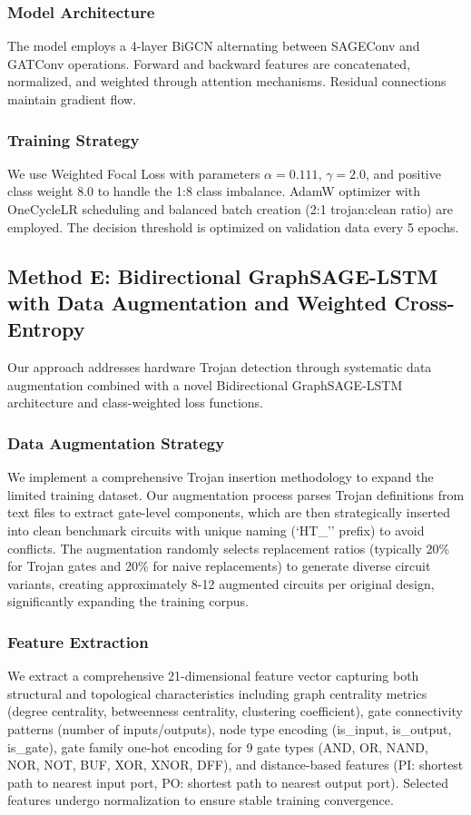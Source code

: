 \documentclass[conference]{IEEEtran}
\begin{document}
\subsubsection{Model Architecture}
The model employs a 4-layer BiGCN alternating between SAGEConv and GATConv operations. Forward and backward features are concatenated, normalized, and weighted through attention mechanisms. Residual connections maintain gradient flow.

\subsubsection{Training Strategy}
We use Weighted Focal Loss with parameters $\alpha=0.111$, $\gamma=2.0$, and positive class weight 8.0 to handle the 1:8 class imbalance. AdamW optimizer with OneCycleLR scheduling and balanced batch creation (2:1 trojan:clean ratio) are employed. The decision threshold is optimized on validation data every 5 epochs.

\FloatBarrier
\subsection{Method E: Bidirectional GraphSAGE-LSTM with Data Augmentation and Weighted Cross-Entropy} 
\label{sec:method_E} 
Our approach addresses hardware Trojan detection through systematic data augmentation combined with a novel Bidirectional GraphSAGE-LSTM architecture and class-weighted loss functions. 

\subsubsection{Data Augmentation Strategy} 
We implement a comprehensive Trojan insertion methodology to expand the limited training dataset. Our augmentation process parses Trojan definitions from text files to extract gate-level components, which are then strategically inserted into clean benchmark circuits with unique naming (`HT\_'' prefix) to avoid conflicts. The augmentation randomly selects replacement ratios (typically 20\% for Trojan gates and 20\% for naive replacements) to generate diverse circuit variants, creating approximately 8-12 augmented circuits per original design, significantly expanding the training corpus. 

\subsubsection{Feature Extraction} 
We extract a comprehensive 21-dimensional feature vector capturing both structural and topological characteristics including graph centrality metrics (degree centrality, betweenness centrality, clustering coefficient), gate connectivity patterns (number of inputs/outputs), node type encoding (is\_input, is\_output, is\_gate), gate family one-hot encoding for 9 gate types (AND, OR, NAND, NOR, NOT, BUF, XOR, XNOR, DFF), and distance-based features (PI: shortest path to nearest input port, PO: shortest path to nearest output port). Selected features undergo normalization to ensure stable training convergence. 
\end{document}
